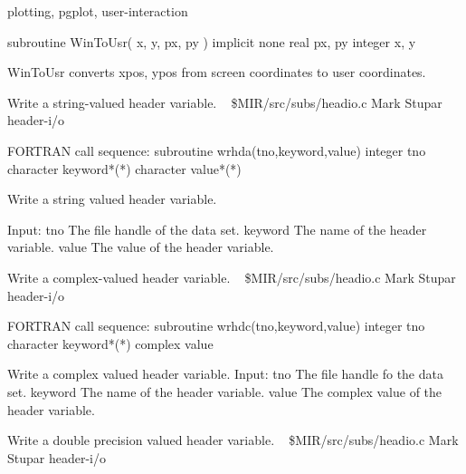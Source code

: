\newline {} plotting, pgplot, user-interaction
\par{\tenpoint
{\eightpoint\begintt
        subroutine WinToUsr( x, y, px, py )
        implicit none
        real px, py
        integer x, y

    WinToUsr converts {xpos, ypos} from screen coordinates to user
    coordinates.
\endtt}
\par}
%
\noindent Write a string-valued header variable.
\newline \ 
\newline {} \$MIR/src/subs/headio.c
\newline {} Mark Stupar
\newline {} header-i/o
\par{\tenpoint
{\eightpoint\begintt
FORTRAN call sequence:
        subroutine wrhda(tno,keyword,value)
        integer tno
        character keyword*(*)
        character value*(*)

  Write a string valued header variable.

  Input:
    tno         The file handle of the data set.
    keyword     The name of the header variable.
    value       The value of the header variable.                       
\endtt}
\par}
%
\noindent Write a complex-valued header variable.
\newline \ 
\newline {} \$MIR/src/subs/headio.c
\newline {} Mark Stupar
\newline \abox{Keywords:} header-i/o
\par{\tenpoint
{\eightpoint\begintt
FORTRAN call sequence:
        subroutine wrhdc(tno,keyword,value)
        integer tno
        character keyword*(*)
        complex value

  Write a complex valued header variable.
  Input:
    tno         The file handle fo the data set.
    keyword     The name of the header variable.
    value       The complex value of the header variable.               
\endtt}
\par}
%
\noindent Write a double precision valued header variable.
\newline \ 
\newline {} \$MIR/src/subs/headio.c
\newline \abox{Responsible:} Mark Stupar
\newline {} header-i/o
